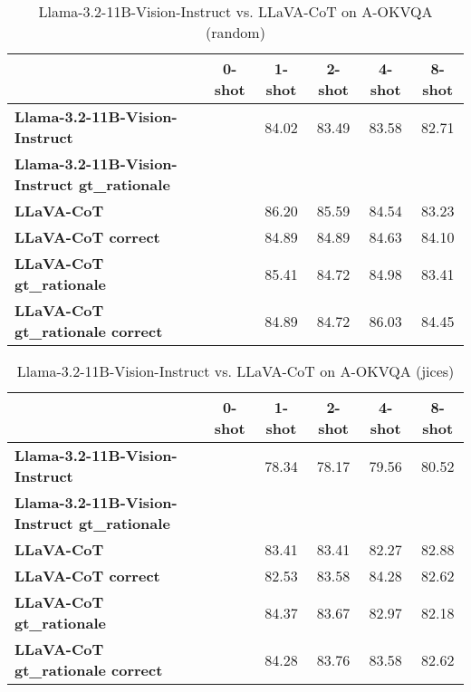 \begin{table}
\caption{Llama-3.2-11B-Vision-Instruct vs. LLaVA-CoT on A-OKVQA (random)}
\label{tab:Llama-3.2-11B-Vision-Instruct_A-OKVQA_TRAIN_random}
\begin{tabular}{lccccc}
\toprule
 & 0-shot & 1-shot & 2-shot & 4-shot & 8-shot \\
\midrule
\textbf{Llama-3.2-11B-Vision-Instruct} &  & 84.02 & 83.49 & 83.58 & 82.71 \\
\textbf{Llama-3.2-11B-Vision-Instruct gt\_rationale} &  &  &  &  &  \\
\textbf{LLaVA-CoT} &  & 86.20 & 85.59 & 84.54 & 83.23 \\
\textbf{LLaVA-CoT correct} &  & 84.89 & 84.89 & 84.63 & 84.10 \\
\textbf{LLaVA-CoT gt\_rationale} &  & 85.41 & 84.72 & 84.98 & 83.41 \\
\textbf{LLaVA-CoT gt\_rationale correct} &  & 84.89 & 84.72 & 86.03 & 84.45 \\
\bottomrule
\end{tabular}
\end{table}


\begin{table}
\caption{Llama-3.2-11B-Vision-Instruct vs. LLaVA-CoT on A-OKVQA (jices)}
\label{tab:Llama-3.2-11B-Vision-Instruct_A-OKVQA_TRAIN_jices}
\begin{tabular}{lccccc}
\toprule
 & 0-shot & 1-shot & 2-shot & 4-shot & 8-shot \\
\midrule
\textbf{Llama-3.2-11B-Vision-Instruct} &  & 78.34 & 78.17 & 79.56 & 80.52 \\
\textbf{Llama-3.2-11B-Vision-Instruct gt\_rationale} &  &  &  &  &  \\
\textbf{LLaVA-CoT} &  & 83.41 & 83.41 & 82.27 & 82.88 \\
\textbf{LLaVA-CoT correct} &  & 82.53 & 83.58 & 84.28 & 82.62 \\
\textbf{LLaVA-CoT gt\_rationale} &  & 84.37 & 83.67 & 82.97 & 82.18 \\
\textbf{LLaVA-CoT gt\_rationale correct} &  & 84.28 & 83.76 & 83.58 & 82.62 \\
\bottomrule
\end{tabular}
\end{table}


